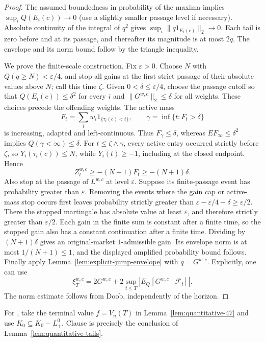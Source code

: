 \begin{proof}
The assumed boundedness in probability of the maxima implies
$\sup_iQ(E_i(c))\to0$ (use a slightly smaller passage level if necessary).
Absolute continuity of the integral of $q^2$ gives
$\sup_i\|q1_{E_i(c)}\|_2\to0$.
Each tail is zero before and at its passage, and thereafter its magnitude is
at most $2q$. The envelope and its norm bound follow by the triangle inequality.

We prove the finite-scale construction. Fix $\varepsilon>0$.
Choose $N$ with $Q(q\geq N)<\varepsilon/4$, and stop all gains at the first
strict passage of their absolute values above $N$; call this time $\zeta$.
Given $0<\delta\leq\varepsilon/4$, choose the passage cutoff so that
$Q(E_i(c))\leq\delta^2$ for every $i$ and $\|G^{w,c}\|_2\leq\delta$
for all weights. These choices precede the offending weights.
The active mass
\[
 F_t=\sum_iw_i1_{\{\tau_i(c)<t\}},\qquad
 \gamma=\inf\{t:F_t>\delta\}
\]
is increasing, adapted and left-continuous. Thus $F_\gamma\leq\delta$,
whereas $EF_\infty\leq\delta^2$ implies $Q(\gamma<\infty)\leq\delta$.
For $t\leq\zeta\wedge\gamma$, every active entry occurred strictly before
$\zeta$, so $Y_i(\tau_i(c))\leq N$, while $Y_i(t)\geq-1$, including at the
closed endpoint. Hence
\[
 Z^{w,c}_t\geq-(N+1)F_t\geq-(N+1)\delta.
\]
Also stop at the passage of $L^{w,c}$ at level $\varepsilon$.
Suppose its finite-passage event has probability greater than $\varepsilon$.
Removing the events where the gain cap or active-mass stop occurs first leaves
probability strictly greater than
$\varepsilon-\varepsilon/4-\delta\geq\varepsilon/2$.
There the stopped martingale has absolute value at least $\varepsilon$,
and therefore strictly greater than $\varepsilon/2$.
Each gain in the finite sum is constant after a finite time, so the stopped
gain also has a constant continuation after a finite time.
Dividing by $(N+1)\delta$ gives an original-market $1$-admissible gain.
Its envelope norm is at most $1/(N+1)\leq1$, and the displayed amplified
probability bound follows.
Finally apply Lemma~\ref{lem:explicit-jump-envelope} with $q=G^{w,c}$.
Explicitly, one can use
\[
 \xi_T^{w,c}=2G^{w,c}
       +2\sup_{t\leq T}|E_Q[G^{w,c}\mid\mathcal F_t]|.
\]
The norm estimate follows from Doob, independently of the horizon.
\end{proof}

For , take the terminal value $f=V_n(T)$ in Lemma~\ref{lem:quantitative-47}
and use $K_0\subseteq K_0-L^0_+$. Clause  is precisely the conclusion of Lemma~\ref{lem:quantitative-tails}.
